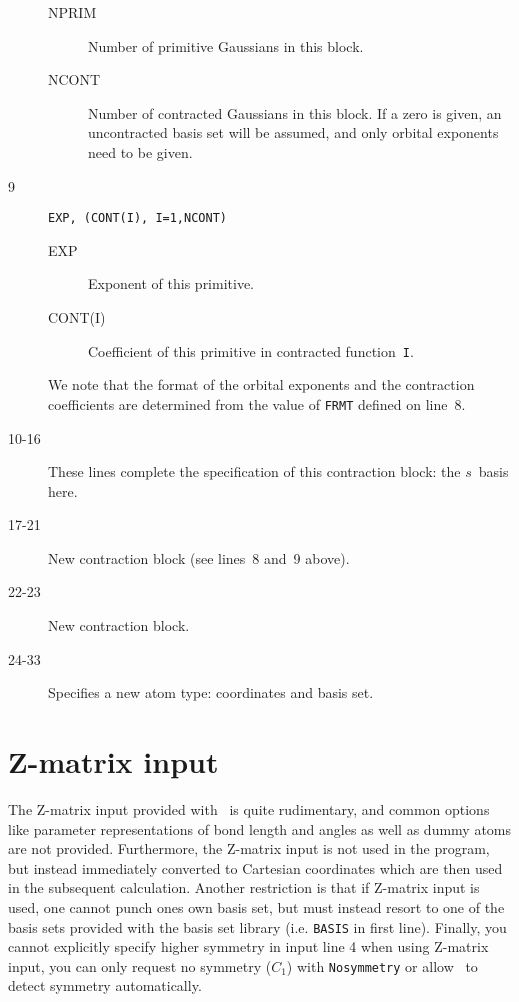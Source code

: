 \begin{description}
\begin{description}
\item[NPRIM] Number of primitive
Gaussians in this block.
\item[NCONT] Number of contracted
Gaussians in this block. If a zero
is given, an uncontracted basis set will be assumed, and only orbital
exponents need to be given.
\end{description}
\item[9] \verb|EXP, (CONT(I), I=1,NCONT)|
\begin{description}
\item[EXP] Exponent of this primitive.
\item[CONT(I)] Coefficient of this primitive in contracted
function~{\tt I}.
\end{description}
We note that the format of the orbital exponents 
and the contraction
coefficients are determined from the value of {\tt FRMT} defined on
line~8.
\item[10-16] These lines complete the specification of this
contraction block: the $s$~basis here.
\item[17-21] New contraction block (see lines~8 and~9 above).
\item[22-23] New contraction block.
\item[24-33] Specifies a new atom type: coordinates and basis set.
\end{description}

\section{Z-matrix input}\label{sec:molzmat}

The Z-matrix input provided with \dalton\ is quite rudimentary, and
common options like parameter representations of bond length and
angles as well as dummy atoms are not provided. Furthermore,
the Z-matrix input is not used in the program, but instead immediately
converted to Cartesian coordinates which are then used in the
subsequent calculation.
Another restriction is that if Z-matrix input is used, one cannot
punch ones own basis set, but must instead resort to one of the basis sets
provided with the basis set library (i.e. {\tt BASIS} in first line).
Finally, you cannot explicitly specify higher symmetry in input line 4
when using Z-matrix input,
you can only request no symmetry ($C_1$) with \verb|Nosymmetry|
or allow \dalton\ to detect symmetry automatically.

